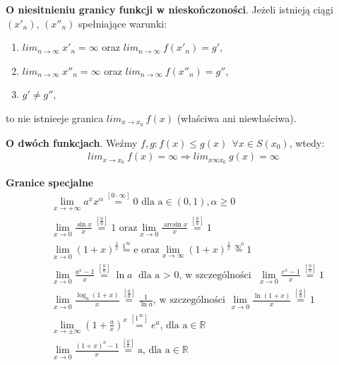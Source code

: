 \documentclass[main.tex]{subfiles}
\begin{document}
    \begin{theorem}
        \textbf{O niesitnieniu granicy funkcji w nieskończoności}. Jeżeli istnieją ciągi $(x'_n)$, $(x''_n)$
        spełniające warunki:
        \begin{enumerate}
            \item $lim_{n \rightarrow \infty} ~ x'_n = \infty $ oraz $ lim_{n \rightarrow \infty} ~ f(x'_n) = g'$,
            \item $lim_{n \rightarrow \infty} ~ x''_n = \infty $ oraz $ lim_{n \rightarrow \infty} ~ f(x''_n) = g''$,
            \item $g' \neq g''$,
        \end{enumerate}
        to nie istnieeje granica $lim_{x \rightarrow x_0} ~ f(x)$ (właściwa ani niewłaściwa).
    \end{theorem}

    \begin{theorem}
        \textbf{O dwóch funkcjach}. Weźmy $f, g: f(x) \leq g(x) ~~ \forall x \in S(x_0)$, wtedy:
        \begin{gather*}
            lim_{x \rightarrow x_0} ~ f(x) = \infty \Rightarrow lim_{x \infty x_0} ~ g(x) = \infty
        \end{gather*}
    \end{theorem}

    \textbf{Granice specjalne}
    \setlength{\jot}{10pt}
    \begin{align*}
        &\lim_{x \to +\infty} a^{x} x^{\alpha} \stackrel{[0 \cdot \infty]}{=}  \text{0 dla a} \in (0, 1), \alpha \geq 0 \\
        &\lim_{x \to 0} \frac{\sin{x}}{x} \stackrel{[\frac{0}{0}]}{=} \text{1 oraz}    \lim_{x \to 0} \frac{\arcsin{x}}{x} \stackrel{[\frac{0}{0}]}{=} 1\\
        &\lim_{x \to 0} (1 + x)^{\frac{1}{x}} \stackrel{1^{\infty}}{=} \text{e oraz}   \lim_{x \to \infty} (1 + x)^{\frac{1}{x}} \stackrel{\infty^{0}}{=} 1 \\
        &\lim_{x \to 0} \frac{a^x -1}{x} \stackrel{[\frac{0}{0}]}{=} \ln{a} \text{ dla a $>$ 0, w szczególności } \lim_{x \to 0} \frac{e^x -1}{x} \stackrel{[\frac{0}{0}]}{=} 1 \\
        &\lim_{x \to 0} \frac{\log_{a}(1 + x)}{x} \stackrel{[\frac{0}{0}]}{=} \frac{1}{\ln{a}} \text{, w szczególności } \lim_{x \to 0} \frac{\ln(1 + x)}{x} \stackrel{[\frac{0}{0}]}{=} 1 \\
        &\lim_{x \to \pm \infty} (1 + \frac{a}{x})^{x} \stackrel{[1^{\infty}]}{=} e^{a} \text{, dla a} \in \mathbb{R} \\
        &\lim_{x \to 0} \frac{(1 + x)^a - 1}{x} \stackrel{[\frac{0}{0}]}{=} \text{a, dla a} \in \mathbb{R}
    \end{align*}
\end{document}
